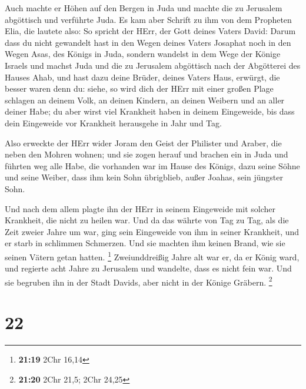  Auch machte er Höhen auf den Bergen in Juda und machte die
zu Jerusalem abgöttisch und verführte Juda.  Es kam aber
Schrift zu ihm von dem Propheten Elia, die lautete also: So spricht der
HErr, der Gott deines Vaters David: Darum dass du nicht gewandelt hast
in den Wegen deines Vaters Josaphat noch in den Wegen Asas, des Königs
in Juda,  sondern wandelst in dem Wege der Könige Israels
und machst Juda und die zu Jerusalem abgöttisch nach der Abgötterei des
Hauses Ahab, und hast dazu deine Brüder, deines Vaters Haus, erwürgt,
die besser waren denn du:  siehe, so wird dich der HErr mit
einer großen Plage schlagen an deinem Volk, an deinen Kindern, an deinen
Weibern und an aller deiner Habe;  du aber wirst viel
Krankheit haben in deinem Eingeweide, bis dass dein Eingeweide vor
Krankheit herausgehe in Jahr und Tag.

 Also erweckte der HErr wider Joram den Geist der Philister
und Araber, die neben den Mohren wohnen;  und sie zogen
herauf und brachen ein in Juda und führten weg alle Habe, die vorhanden
war im Hause des Königs, dazu seine Söhne und seine Weiber, dass ihm
kein Sohn übrigblieb, außer Joahas, sein jüngster Sohn.

 Und nach dem allem plagte ihn der HErr in seinem
Eingeweide mit solcher Krankheit, die nicht zu heilen war. 
Und da das währte von Tag zu Tag, als die Zeit zweier Jahre um war, ging
sein Eingeweide von ihm in seiner Krankheit, und er starb in schlimmen
Schmerzen. Und sie machten ihm keinen Brand, wie sie seinen Vätern getan
hatten. \footnote{\textbf{21:19} 2Chr 16,14} 
Zweiunddreißig Jahre alt war er, da er König ward, und regierte acht
Jahre zu Jerusalem und wandelte, dass es nicht fein war. Und sie
begruben ihn in der Stadt Davids, aber nicht in der Könige Gräbern.
\footnote{\textbf{21:20} 2Chr 21,5; 2Chr 24,25}

\hypertarget{section-4}{%
\section{22}\label{section-4}}

